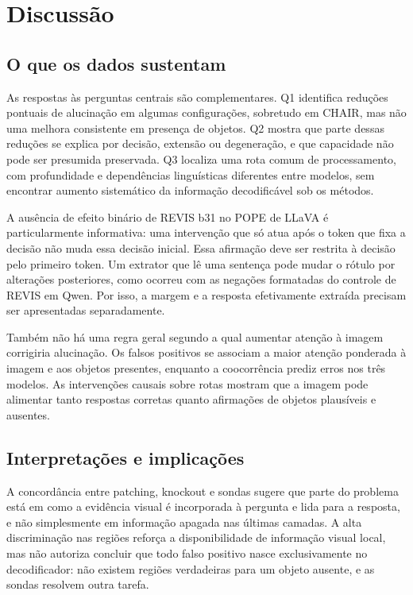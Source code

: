\section{Discussão}
\subsection{O que os dados sustentam}
As respostas às perguntas centrais são complementares. Q1 identifica reduções pontuais de alucinação em algumas configurações, sobretudo em CHAIR, mas não uma melhora consistente em presença de objetos. Q2 mostra que parte dessas reduções se explica por decisão, extensão ou degeneração, e que capacidade não pode ser presumida preservada. Q3 localiza uma rota comum de processamento, com profundidade e dependências linguísticas diferentes entre modelos, sem encontrar aumento sistemático da informação decodificável sob os métodos.

A ausência de efeito binário de REVIS b31 no POPE de LLaVA é particularmente informativa: uma intervenção que só atua após o token que fixa a decisão não muda essa decisão inicial. Essa afirmação deve ser restrita à decisão pelo primeiro token. Um extrator que lê uma sentença pode mudar o rótulo por alterações posteriores, como ocorreu com as negações formatadas do controle de REVIS em Qwen. Por isso, a margem e a resposta efetivamente extraída precisam ser apresentadas separadamente.

Também não há uma regra geral segundo a qual aumentar atenção à imagem corrigiria alucinação. Os falsos positivos se associam a maior atenção ponderada à imagem e aos objetos presentes, enquanto a coocorrência prediz erros nos três modelos. As intervenções causais sobre rotas mostram que a imagem pode alimentar tanto respostas corretas quanto afirmações de objetos plausíveis e ausentes.

\subsection{Interpretações e implicações}
A concordância entre patching, knockout e sondas sugere que parte do problema está em como a evidência visual é incorporada à pergunta e lida para a resposta, e não simplesmente em informação apagada nas últimas camadas. A alta discriminação nas regiões reforça a disponibilidade de informação visual local, mas não autoriza concluir que todo falso positivo nasce exclusivamente no decodificador: não existem regiões verdadeiras para um objeto ausente, e as sondas resolvem outra tarefa.

